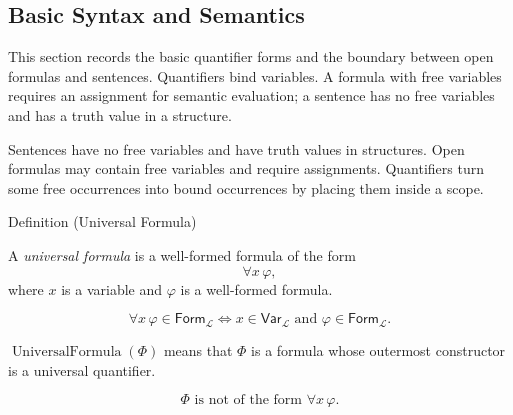 
\subsection*{Basic Syntax and Semantics}

\begin{remark*}
This section records the basic quantifier forms and the boundary between open
formulas and sentences. Quantifiers bind variables. A formula with free
variables requires an assignment for semantic evaluation; a sentence has no
free variables and has a truth value in a structure.
\end{remark*}

\begin{remark*}[Exposition]
Sentences have no free variables and have truth values in structures. Open
formulas may contain free variables and require assignments. Quantifiers turn
some free occurrences into bound occurrences by placing them inside a scope.
\end{remark*}

\begin{definitionbox}{Definition (Universal Formula)}
\begin{definition}
\label{def:universal-q}
A \emph{universal formula} is a well-formed formula of the form
\[
\forall x\,\varphi,
\]
where \(x\) is a variable and \(\varphi\) is a well-formed formula.
\end{definition}
\end{definitionbox}

\begin{remark*}
\[
\forall x\,\varphi\in\mathsf{Form}_{\mathcal L}
\Longleftrightarrow
x\in\mathsf{Var}_{\mathcal L}
\text{ and }
\varphi\in\mathsf{Form}_{\mathcal L}.
\]
\end{remark*}

\begin{remark*}
\(\operatorname{UniversalFormula}(\Phi)\) means that \(\Phi\) is a formula
whose outermost constructor is a universal quantifier.
\end{remark*}

\begin{remark*}
\[
\Phi \text{ is not of the form } \forall x\,\varphi.
\]
\end{remark*}

